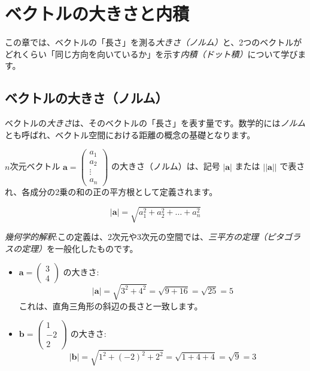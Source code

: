 \section{ベクトルの大きさと内積}

この章では、ベクトルの「長さ」を測る\emph{大きさ（ノルム）}と、2つのベクトルがどれくらい「同じ方向を向いているか」を示す\emph{内積（ドット積）}について学びます。

\subsection{ベクトルの大きさ（ノルム）}

ベクトルの\emph{大きさ}は、そのベクトルの「長さ」を表す量です。数学的には\emph{ノルム}とも呼ばれ、ベクトル空間における距離の概念の基礎となります。
\begin{dfn}
$n$次元ベクトル $\bm{a} = \begin{pmatrix} a_1 \\ a_2 \\ \vdots \\ a_n \end{pmatrix}$ の大きさ（ノルム）は、記号 $|\bm{a}|$ または $||\bm{a}||$ で表され、各成分の2乗の和の正の平方根として定義されます。

\[|\bm{a}| = \sqrt{a_1^2 + a_2^2 + \dots + a_n^2}\]
\end{dfn}

\emph{幾何学的解釈}:この定義は、2次元や3次元の空間では、\emph{三平方の定理（ピタゴラスの定理）}を一般化したものです。

\begin{ex}
\begin{itemize}
\item $\bm{a} = \begin{pmatrix} 3 \\ 4 \end{pmatrix}$ の大きさ:
    \[|\bm{a}| = \sqrt{3^2 + 4^2} = \sqrt{9 + 16} = \sqrt{25} = 5\]
    これは、直角三角形の斜辺の長さと一致します。

\item $\bm{b} = \begin{pmatrix} 1 \\ -2 \\ 2 \end{pmatrix}$ の大きさ:
    \[|\bm{b}| = \sqrt{1^2 + (-2)^2 + 2^2} = \sqrt{1 + 4 + 4} = \sqrt{9} = 3\]
\end{itemize}
\end{ex}

